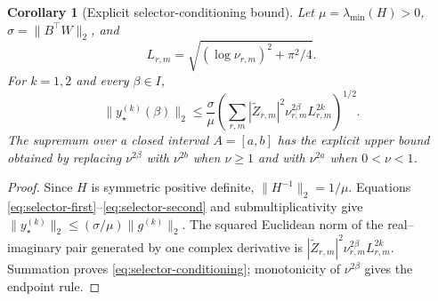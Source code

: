 \documentclass[11pt]{article}
\newtheorem{corollary}[theorem]{Corollary}
\theoremstyle{definition}
\theoremstyle{remark}
\begin{document}
\begin{corollary}[Explicit selector-conditioning bound]
\label{cor:selector-conditioning}
Let \(\mu=\lambda_{\min}(H)>0\),
\(\sigma=\|B^\top W\|_2\), and
\[
 L_{r,m}=\sqrt{(\log\nu_{r,m})^2+\pi^2/4}.
\]
For \(k=1,2\) and every \(\beta\in I\),
\begin{equation}
 \|y_\star^{(k)}(\beta)\|_2
 \le \frac{\sigma}{\mu}
 \left(\sum_{r,m}|\widetilde Z_{r,m}|^2
 \nu_{r,m}^{2\beta}L_{r,m}^{2k}\right)^{1/2}.
 \label{eq:selector-conditioning}
\end{equation}
The supremum over a closed interval \(A=[a,b]\) has the explicit upper bound
obtained by replacing \(\nu^{2\beta}\) with \(\nu^{2b}\) when \(\nu\ge1\)
and with \(\nu^{2a}\) when \(0<\nu<1\).
\end{corollary}
\begin{proof}
Since \(H\) is symmetric positive definite,
\(\|H^{-1}\|_2=1/\mu\).  Equations
\eqref{eq:selector-first}--\eqref{eq:selector-second} and
submultiplicativity give
\(\|y_\star^{(k)}\|_2\le(\sigma/\mu)\|g^{(k)}\|_2\).
The squared Euclidean norm of the real--imaginary pair generated by one
complex derivative is
\(|\widetilde Z_{r,m}|^2\nu_{r,m}^{2\beta}L_{r,m}^{2k}\).
Summation proves \eqref{eq:selector-conditioning}; monotonicity of
\(\nu^{2\beta}\) gives the endpoint rule.
\end{proof}
\end{document}
